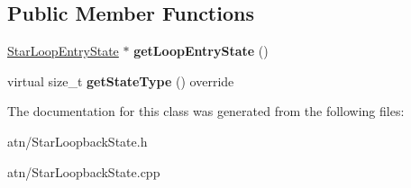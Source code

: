 \subsection*{Public Member Functions}
\begin{DoxyCompactItemize}
\item 
\mbox{\label{classantlr4_1_1atn_1_1StarLoopbackState_aa71ac0fccec88c900fd5a363e4f1fae8}} 
\hyperlink{classantlr4_1_1atn_1_1StarLoopEntryState}{Star\+Loop\+Entry\+State} $\ast$ {\bfseries get\+Loop\+Entry\+State} ()
\item 
\mbox{\label{classantlr4_1_1atn_1_1StarLoopbackState_a36c22d63153d46f7e8d1420a6717c5da}} 
virtual size\+\_\+t {\bfseries get\+State\+Type} () override
\end{DoxyCompactItemize}


The documentation for this class was generated from the following files\+:\begin{DoxyCompactItemize}
\item 
atn/Star\+Loopback\+State.\+h\item 
atn/Star\+Loopback\+State.\+cpp\end{DoxyCompactItemize}
